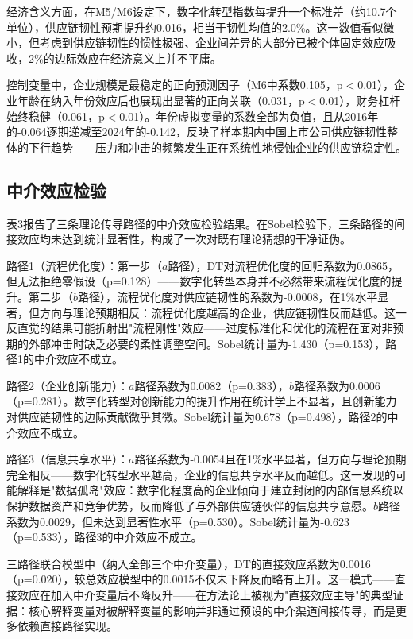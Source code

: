 经济含义方面，在M5/M6设定下，数字化转型指数每提升一个标准差（约10.7个单位），供应链韧性预期提升约0.016，相当于韧性均值的2.0\%。这一数值看似微小，但考虑到供应链韧性的惯性极强、企业间差异的大部分已被个体固定效应吸收，2\%的边际效应在经济意义上并不平庸。

控制变量中，企业规模是最稳定的正向预测因子（M6中系数0.105，p$<$0.01），企业年龄在纳入年份效应后也展现出显著的正向关联（0.031，p$<$0.01），财务杠杆始终稳健（0.061，p$<$0.01）。年份虚拟变量的系数全部为负值，且从2016年的-0.064逐期递减至2024年的-0.142，反映了样本期内中国上市公司供应链韧性整体的下行趋势——压力和冲击的频繁发生正在系统性地侵蚀企业的供应链稳定性。


\FloatBarrier

\subsection{中介效应检验}

表3报告了三条理论传导路径的中介效应检验结果。在Sobel检验下，三条路径的间接效应均未达到统计显著性，构成了一次对既有理论猜想的干净证伪。

路径1（流程优化度）：第一步（$a$路径），DT对流程优化度的回归系数为0.0865，但无法拒绝零假设（p=0.128）——数字化转型本身并不必然带来流程优化度的提升。第二步（$b$路径），流程优化度对供应链韧性的系数为-0.0008，在1\%水平显著，但方向与理论预期相反：流程优化度越高的企业，供应链韧性反而越低。这一反直觉的结果可能折射出"流程刚性"效应——过度标准化和优化的流程在面对非预期的外部冲击时缺乏必要的柔性调整空间。Sobel统计量为-1.430（p=0.153），路径1的中介效应不成立。

路径2（企业创新能力）：$a$路径系数为0.0082（p=0.383），$b$路径系数为0.0006（p=0.281）。数字化转型对创新能力的提升作用在统计学上不显著，且创新能力对供应链韧性的边际贡献微乎其微。Sobel统计量为0.678（p=0.498），路径2的中介效应不成立。

路径3（信息共享水平）：$a$路径系数为-0.0054且在1\%水平显著，但方向与理论预期完全相反——数字化转型水平越高，企业的信息共享水平反而越低。这一发现的可能解释是"数据孤岛"效应：数字化程度高的企业倾向于建立封闭的内部信息系统以保护数据资产和竞争优势，反而降低了与外部供应链伙伴的信息共享意愿。$b$路径系数为0.0029，但未达到显著性水平（p=0.530）。Sobel统计量为-0.623（p=0.533），路径3的中介效应不成立。

三路径联合模型中（纳入全部三个中介变量），DT的直接效应系数为0.0016（p=0.020），较总效应模型中的0.0015不仅未下降反而略有上升。这一模式——直接效应在加入中介变量后不降反升——在方法论上被视为"直接效应主导"的典型证据：核心解释变量对被解释变量的影响并非通过预设的中介渠道间接传导，而是更多依赖直接路径实现。

